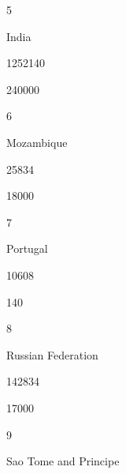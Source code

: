 \documentclass[letterpaper,10pt,english]{sphinxmanual}
\begin{document}
5





India





1252140





240000









6





Mozambique





25834





18000









7





Portugal





10608





140









8





Russian Federation





142834





17000









9





Sao Tome and Principe
\end{document}
